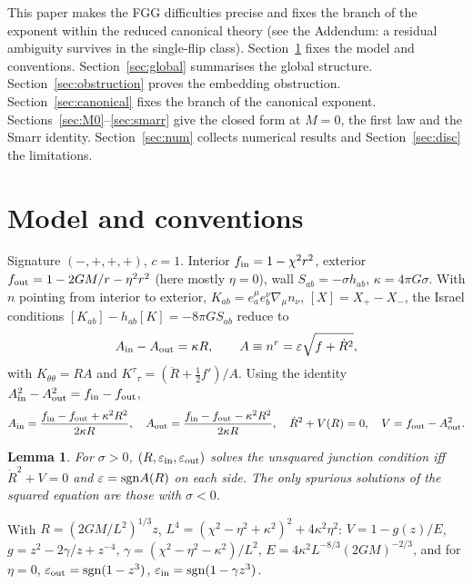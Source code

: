 \documentclass[11pt,a4paper]{article}
\newtheorem{lemma}[theorem]{Lemma}
\theoremstyle{remark}\newtheorem{remark}[theorem]{Remark}
\newcommand{\ein}{\varepsilon_{\rm in}}
\newcommand{\eout}{\varepsilon_{\rm out}}
\newcommand{\fin}{f_{\rm in}}
\newcommand{\fout}{f_{\rm out}}
\begin{document}
This paper makes the FGG difficulties precise and fixes the branch of the exponent within the reduced canonical
theory (see the Addendum: a residual ambiguity survives in the single-flip class). Section~\ref{sec:setup} fixes the model and conventions. Section~\ref{sec:global} summarises the global
structure. Section~\ref{sec:obstruction} proves the embedding obstruction. Section~\ref{sec:canonical} fixes the
branch of the canonical exponent. Sections~\ref{sec:M0}--\ref{sec:smarr} give the closed form at $M=0$, the first law
and the Smarr identity. Section~\ref{sec:num} collects numerical results and Section~\ref{sec:disc} the limitations.

\section{Model and conventions}\label{sec:setup}
Signature $(-,+,+,+)$, $c=1$. Interior $\fin=1-\chi^2r^2$, exterior $\fout=1-2GM/r-\eta^2r^2$ (here mostly $\eta=0$), wall
$S_{ab}=-\sigma h_{ab}$, $\kappa=4\pi G\sigma$. With $n$ pointing from interior to exterior, $K_{ab}=e^\mu_ae^\nu_b\nabla_\mu n_\nu$,
$[X]=X_+-X_-$, the Israel conditions $[K_{ab}]-h_{ab}[K]=-8\pi GS_{ab}$ reduce to
\begin{equation}
A_{\rm in}-A_{\rm out}=\kappa R,\qquad A\equiv n^r=\varepsilon\sqrt{f+\dot R^2},
\end{equation}
with $K_{\theta\theta}=RA$ and $K^\tau{}_\tau=(\ddot R+\tfrac12f')/A$. Using the identity $A_{\rm in}^2-A_{\rm out}^2=\fin-\fout$,
\begin{equation}
A_{\rm in}=\frac{\fin-\fout+\kappa^2R^2}{2\kappa R},\quad A_{\rm out}=\frac{\fin-\fout-\kappa^2R^2}{2\kappa R},\quad
\dot R^2+V(R)=0,\quad V=\fout-A_{\rm out}^2 .
\end{equation}
\begin{lemma}\label{lem:J1}
For $\sigma>0$, $(R,\ein,\eout)$ solves the unsquared junction condition iff $\dot R^2+V=0$ and $\varepsilon={\rm sgn}A(R)$ on
each side. The only spurious solutions of the squared equation are those with $\sigma<0$.
\end{lemma}
With $R=(2GM/L^2)^{1/3}z$, $L^4=(\chi^2-\eta^2+\kappa^2)^2+4\kappa^2\eta^2$: $V=1-g(z)/E$, $g=z^2-2\gamma/z+z^{-4}$,
$\gamma=(\chi^2-\eta^2-\kappa^2)/L^2$, $E=4\kappa^2L^{-8/3}(2GM)^{-2/3}$, and for $\eta=0$, $\eout={\rm sgn}(1-z^3)$,
$\ein={\rm sgn}(1-\gamma z^3)$.
\end{document}

